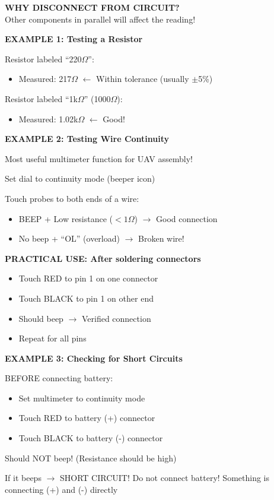 \documentclass[11pt,letterpaper]{article}
\begin{document}
\textbf{WHY DISCONNECT FROM CIRCUIT?}\\
Other components in parallel will affect the reading!

\begin{examplebox}
\textbf{EXAMPLE 1: Testing a Resistor}

Resistor labeled ``220$\Omega$'':
\begin{itemize}[nosep]
\item Measured: 217$\Omega$ $\leftarrow$ Within tolerance (usually $\pm$5\%)
\end{itemize}

Resistor labeled ``1k$\Omega$'' (1000$\Omega$):
\begin{itemize}[nosep]
\item Measured: 1.02k$\Omega$ $\leftarrow$ Good!
\end{itemize}
\end{examplebox}

\begin{examplebox}
\textbf{EXAMPLE 2: Testing Wire Continuity}

Most useful multimeter function for UAV assembly!

Set dial to continuity mode (beeper icon)

Touch probes to both ends of a wire:
\begin{itemize}[nosep]
\item BEEP + Low resistance ($< 1\Omega$) $\rightarrow$ Good connection
\item No beep + ``OL'' (overload) $\rightarrow$ Broken wire!
\end{itemize}

\textbf{PRACTICAL USE: After soldering connectors}
\begin{itemize}[nosep]
\item Touch RED to pin 1 on one connector
\item Touch BLACK to pin 1 on other end
\item Should beep $\rightarrow$ Verified connection
\item Repeat for all pins
\end{itemize}
\end{examplebox}

\begin{examplebox}
\textbf{EXAMPLE 3: Checking for Short Circuits}

BEFORE connecting battery:
\begin{itemize}[nosep]
\item Set multimeter to continuity mode
\item Touch RED to battery (+) connector
\item Touch BLACK to battery (-) connector
\end{itemize}

Should NOT beep! (Resistance should be high)

If it beeps $\rightarrow$ SHORT CIRCUIT! Do not connect battery! Something is connecting (+) and (-) directly
\end{examplebox}
\end{document}
